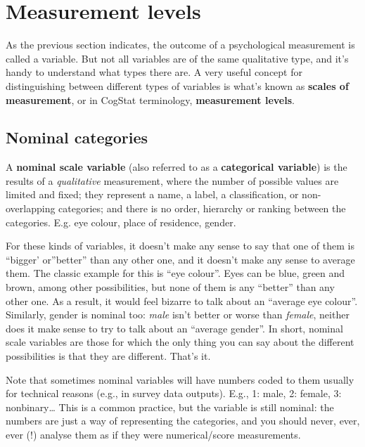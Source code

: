 \documentclass[
  11pt,
  a4paper,
  twoside,symmetric,openright]{book}
\theoremstyle{break}
\theoremstyle{break}
\begin{document}
\section{Measurement levels}\label{scales}

As the previous section indicates, the outcome of a psychological measurement is called a variable. But not all variables are of the same qualitative type, and it's handy to understand what types there are. A very useful concept for distinguishing between different types of variables is what's known as \textbf{scales of measurement}, or in CogStat terminology, \textbf{measurement levels}.

\subsection{Nominal categories}\label{nominalscale}

\begin{definition}
\protect\hypertarget{def:defnominal}{}\label{def:defnominal}A \textbf{nominal scale variable} (also referred to as a \textbf{categorical variable}) is the results of a \emph{qualitative} measurement, where the number of possible values are limited and fixed; they represent a name, a label, a classification, or non-overlapping categories; and there is no order, hierarchy or ranking between the categories. E.g. eye colour, place of residence, gender.
\end{definition}

For these kinds of variables, it doesn't make any sense to say that one of them is ``bigger' or''better'' than any other one, and it doesn't make any sense to average them. The classic example for this is ``eye colour''. Eyes can be blue, green and brown, among other possibilities, but none of them is any ``better'' than any other one. As a result, it would feel bizarre to talk about an ``average eye colour''. Similarly, gender is nominal too: \emph{male} isn't better or worse than \emph{female}, neither does it make sense to try to talk about an ``average gender''. In short, nominal scale variables are those for which the only thing you can say about the different possibilities is that they are different. That's it.

Note that sometimes nominal variables will have numbers coded to them usually for technical reasons (e.g., in survey data outputs). E.g., 1: male, 2: female, 3: nonbinary\ldots{} This is a common practice, but the variable is still nominal: the numbers are just a way of representing the categories, and you should never, ever, ever (!) analyse them as if they were numerical/score measurements.
\end{document}
